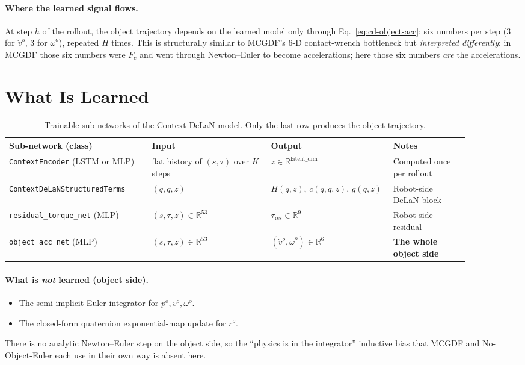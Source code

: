 \documentclass[11pt]{article}
\begin{document}
\paragraph{Where the learned signal flows.}
At step $h$ of the rollout, the object trajectory depends on the
learned model only through Eq.~\eqref{eq:cd-object-acc}: six numbers
per step (3 for $\dot v^o$, 3 for $\dot\omega^o$), repeated $H$ times.
This is structurally similar to MCGDF's 6-D contact-wrench bottleneck
but \emph{interpreted differently}: in MCGDF those six numbers were
$F_c$ and went through Newton--Euler to become accelerations; here
those six numbers \emph{are} the accelerations.

\section{What Is Learned}

\begin{table}[h]
\centering
\small
\begin{tabular}{p{0.30\linewidth} p{0.25\linewidth} p{0.18\linewidth} p{0.16\linewidth}}
\toprule
Sub-network (class) & Input & Output & Notes \\
\midrule
\texttt{ContextEncoder} (LSTM or MLP) & flat history of $(s,\tau)$ over $K$ steps & $z \in \mathbb{R}^{\mathrm{latent\_dim}}$ & Computed once per rollout \\
\texttt{ContextDeLaNStructuredTerms} & $(q, \dot q, z)$ & $H(q,z),\, c(q,\dot q, z),\, g(q,z)$ & Robot-side DeLaN block \\
\texttt{residual\_torque\_net} (MLP) & $(s, \tau, z) \in \mathbb{R}^{53}$ & $\tau_{\mathrm{res}} \in \mathbb{R}^{9}$ & Robot-side residual \\
\texttt{object\_acc\_net} (MLP) & $(s, \tau, z) \in \mathbb{R}^{53}$ & $(\dot v^o,\dot\omega^o) \in \mathbb{R}^{6}$ & \textbf{The whole object side} \\
\bottomrule
\end{tabular}
\caption{Trainable sub-networks of the Context DeLaN model.  Only the
last row produces the object trajectory.}
\label{tab:cd-subnets}
\end{table}

\paragraph{What is \emph{not} learned (object side).}
\begin{itemize}
  \item The semi-implicit Euler integrator for $p^o, v^o, \omega^o$.
  \item The closed-form quaternion exponential-map update for $r^o$.
\end{itemize}
There is no analytic Newton--Euler step on the object side, so the
``physics is in the integrator'' inductive bias that MCGDF and
No-Object-Euler each use in their own way is absent here.
\end{document}
